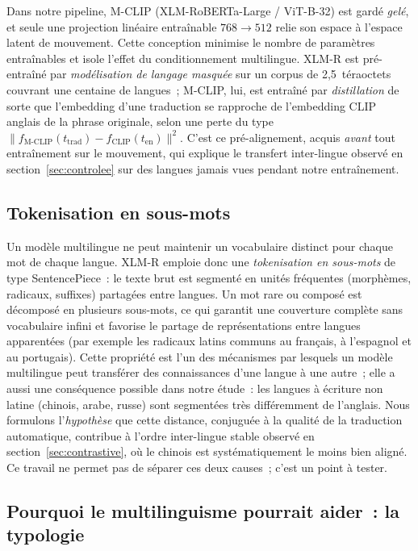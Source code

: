 \documentclass[12pt,a4paper,oneside]{report}
\theoremstyle{definition}
\theoremstyle{plain}
\begin{document}
Dans notre pipeline, M-CLIP (XLM-RoBERTa-Large / ViT-B-32) est gardé \emph{gelé},
et seule une projection linéaire entraînable $768\rightarrow512$ relie son espace
à l'espace latent de mouvement. Cette conception minimise le nombre de paramètres
entraînables et isole l'effet du conditionnement multilingue. XLM-R est
pré-entraîné par \emph{modélisation de langage masquée} sur un corpus de
2,5~téraoctets couvrant une centaine de langues~; M-CLIP, lui, est entraîné par
\emph{distillation} de sorte que l'embedding d'une traduction se rapproche de
l'embedding CLIP anglais de la phrase originale, selon une perte du type
$\lVert f_{\text{M-CLIP}}(t_{\text{trad}}) - f_{\text{CLIP}}(t_{\text{en}})\rVert^2$.
C'est ce pré-alignement, acquis \emph{avant} tout entraînement sur le mouvement,
qui explique le transfert inter-lingue observé en section~\ref{sec:controlee} sur
des langues jamais vues pendant notre entraînement.

\subsection{Tokenisation en sous-mots}

Un modèle multilingue ne peut maintenir un vocabulaire distinct pour chaque mot de
chaque langue. XLM-R emploie donc une \emph{tokenisation en sous-mots} de type
SentencePiece~: le texte brut est segmenté en unités fréquentes (morphèmes,
radicaux, suffixes) partagées entre langues. Un mot rare ou composé est décomposé
en plusieurs sous-mots, ce qui garantit une couverture complète sans vocabulaire
infini et favorise le partage de représentations entre langues apparentées (par
exemple les radicaux latins communs au français, à l'espagnol et au portugais).
Cette propriété est l'un des mécanismes par lesquels un modèle multilingue peut
transférer des connaissances d'une langue à une autre~; elle a aussi une
conséquence possible dans notre étude~: les langues à écriture non latine (chinois,
arabe, russe) sont segmentées très différemment de l'anglais. Nous formulons
l'\emph{hypothèse} que cette distance, conjuguée à la qualité de la traduction
automatique, contribue à l'ordre inter-lingue stable observé en
section~\ref{sec:contrastive}, où le chinois est systématiquement le moins bien
aligné. Ce travail ne permet pas de séparer ces deux causes~; c'est un point à
tester.

\subsection{Pourquoi le multilinguisme pourrait aider~: la typologie}
\label{sub:typologie}
\end{document}
